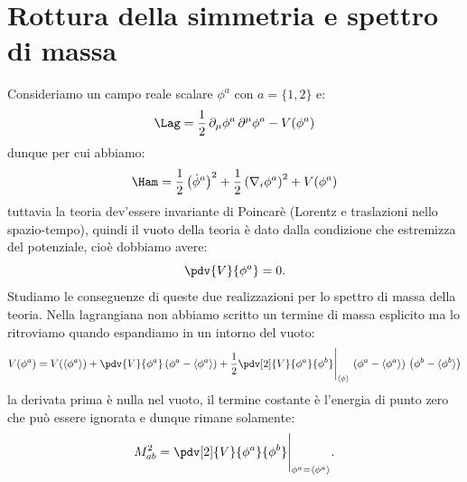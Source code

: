 \section{Rottura della simmetria e spettro di massa}

Consideriamo un campo reale scalare $\phi^a$ con $a=\{1,2\}$ e:
\begin{equation}
    \Lag = \frac{1}{2}\, \partial_\mu\phi^a\, \partial^\mu\phi^a - V(\phi^a)
\end{equation}
dunque per cui abbiamo:
\begin{equation}
    \Ham = \frac{1}{2}\left(\dot{\phi}^a\right)^2 + \frac{1}{2}\left(\nabla_i\phi^a\right)^2 + V(\phi^a)
\end{equation}
tuttavia la teoria dev'essere invariante di Poincarè (Lorentz e traslazioni nello spazio-tempo), quindi il vuoto della teoria è dato dalla condizione che estremizza del potenziale, cioè dobbiamo avere:
\begin{equation}
    \pdv{V}{\phi^a} = 0.
\end{equation}
Studiamo le conseguenze di queste due realizzazioni per lo spettro di massa della teoria. Nella lagrangiana non abbiamo scritto un termine di massa esplicito ma lo ritroviamo quando espandiamo in un intorno del vuoto:
\begin{equation}
    V(\phi^a) = V(\langle\phi^a\rangle) + \pdv{V}{\phi^a}\, (\phi^a - \langle\phi^a\rangle) + \frac{1}{2}\pdv[2]{V}{\phi^a}{\phi^b}\Bigg|_{\langle\phi\rangle}\, \left( \phi^a - \langle\phi^a\rangle \right)\, \left( \phi^b - \langle\phi^b\rangle \right)
\end{equation}
la derivata prima è nulla nel vuoto, il termine costante è l'energia di punto zero che può essere ignorata e dunque rimane solamente:
\begin{equation}
    M_{ab}^2 = \pdv[2]{V}{\phi^a}{\phi^b}\Bigg|_{\phi^a=\langle\phi^a\rangle}.
\end{equation}

